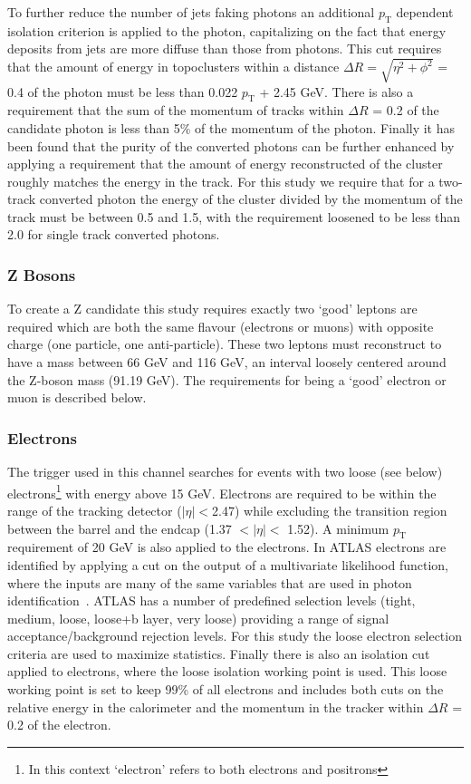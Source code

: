 To further reduce the number of jets faking photons an additional $p_{\mathrm{T}}$ dependent isolation criterion is applied to the photon, capitalizing on the fact that energy deposits from jets are more diffuse than those from photons.  
This cut requires that the amount of energy in topoclusters within a distance $\Delta R=\sqrt{\eta^2+\phi^2}$ = 0.4 of the photon must be less than 0.022 $p_{\mathrm{T}}$ + 2.45 GeV.  
There is also a requirement that the sum of the momentum of tracks within $\Delta R$ = 0.2 of the candidate photon is less than 5\% of the momentum of the photon.  
Finally it has been found that the purity of the converted photons can be further enhanced by applying a requirement that the amount of energy reconstructed of the cluster roughly matches the energy in the track.  
For this study we require that for a two-track converted photon the energy of the cluster divided by the momentum of the track must be between 0.5 and 1.5, with the requirement loosened to be less than 2.0 for single track converted photons.  


\subsubsection{Z Bosons}
To create a Z candidate this study requires exactly two `good' leptons are required which are both the same flavour (electrons or muons) with opposite charge (one particle, one anti-particle). 
These two leptons must reconstruct to have a mass between 66 GeV and 116 GeV, an interval loosely centered around the Z-boson mass (91.19 GeV).  
The requirements for being a `good' electron or muon is described below.  

\subsubsection{Electrons}
The trigger used in this channel searches for events with two loose (see below) electrons\footnote{In this context `electron' refers to both electrons and positrons} with energy above 15 GeV.  
Electrons are required to be within the range of the tracking detector ($\mid\eta\mid<$2.47) while excluding the transition region between the barrel and the endcap (1.37 $<\mid\eta\mid<$ 1.52).  
A minimum $p_{\mathrm T}$ requirement of 20 GeV is also applied to the electrons.  
In ATLAS electrons are identified by applying a cut on the output of a multivariate likelihood function, where the inputs are many of the same variables that are used in photon identification~\cite{ATL-PHYS-PUB-2015-041}.  
ATLAS has a number of predefined selection levels (tight, medium, loose, loose+b layer, very loose) providing a range of signal acceptance/background rejection levels.  
For this study the loose electron selection criteria are used to maximize statistics.  
Finally there is also an isolation cut applied to electrons, where the loose isolation working point is used.  
This loose working point is set to keep 99\% of all electrons and includes both cuts on the relative energy in the calorimeter and the momentum in the tracker within $\Delta R$ = 0.2 of the electron.  

